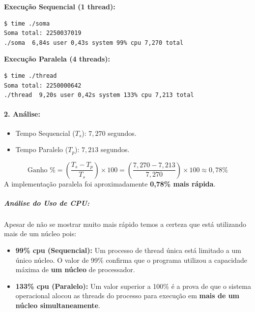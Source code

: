 \documentclass[14pt,a4paper]{article}
\begin{document}
    \textbf{Execução Sequencial (1 thread):}
    \begin{verbatim}
$ time ./soma
Soma total: 2250037019
./soma  6,84s user 0,43s system 99% cpu 7,270 total
    \end{verbatim}

    \textbf{Execução Paralela (4 threads):}
    \begin{verbatim}
$ time ./thread
Soma total: 2250000642
./thread  9,20s user 0,42s system 133% cpu 7,213 total
    \end{verbatim}

    \paragraph{2. Análise:} 

    \begin{itemize}
        \item Tempo Sequencial ($T_s$): $7,270$ segundos.
        \item Tempo Paralelo ($T_p$): $7,213$ segundos.
    \end{itemize}
    $$ \text{Ganho \%} = \left( \frac{T_s - T_p}{T_s} \right) \times 100 = \left( \frac{7,270 - 7,213}{7,270} \right) \times 100 \approx 0,78\% $$
    A implementação paralela foi aproximadamente \textbf{0,78\% mais rápida}.

    \subparagraph{Análise do Uso de CPU:} Apesar de não se mostrar muito mais rápido temos a certeza que está utilizando mais de um núcleo pois:
    \begin{itemize}
        \item \textbf{99\% cpu (Sequencial):} Um processo de thread única está limitado a um único núcleo. O valor de 99\% confirma que o programa utilizou a capacidade máxima de \textbf{um núcleo} de processador.
        \item \textbf{133\% cpu (Paralelo):} Um valor superior a 100\% é a prova de que o sistema operacional alocou as threads do processo para execução em \textbf{mais de um núcleo simultaneamente}. 
    \end{itemize}

\newpage
\end{document}
